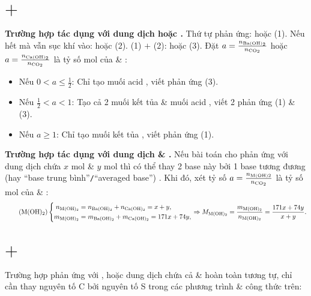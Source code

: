 \documentclass{article}
\begin{document}
\section{ $+$ }
\textbf{\textsf{Trường hợp  tác dụng với dung dịch  hoặc .}} Thứ tự phản ứng:  hoặc  (1). Nếu  hết mà vẫn sục khí  vào:  hoặc  (2). (1) $+$ (2):  hoặc  (3). Đặt $a = \frac{n_{\ce{Ba(OH)2}}}{n_{\ce{CO2}}}$ hoặc $a = \frac{n_{\ce{Ca(OH)2}}}{n_{\ce{CO2}}}$ là tỷ số mol của  \& :
\begin{itemize}
	\item Nếu $0 < a\le\frac{1}{2}$: Chỉ tạo muối acid , viết phản ứng (3).
	\item Nếu $\frac{1}{2} < a < 1$: Tạo cả 2 muối kết tủa  \& muối acid , viết 2 phản ứng (1) \& (3).
	\item Nếu $a\ge1$: Chỉ tạo muối kết tủa , viết phản ứng (1).
\end{itemize}
\textbf{\textsf{Trường hợp  tác dụng với dung dịch  \& .}} Nếu bài toán cho  phản ứng với dung dịch chứa $x$ mol  \& $y$ mol  thì có thể thay 2 base này bởi 1 base tương đương (hay ``base trung bình''{\tt/}``averaged base'') . Khi đó, xét tỷ số $a = \frac{n_{\rm M(OH)2}}{n_{\ce{CO2}}}$ là tỷ số mol của  \& :
\begin{equation}
	\label{M(OH)2}
	\tag{$\rm M(OH)_2$}
	\left\{\begin{split}
		n_{\ce{M(OH)2}} &= n_{\ce{Ba(OH)2}} + n_{\ce{Ca(OH)2}} = x + y,\\
		m_{\ce{M(OH)2}} &= m_{\ce{Ba(OH)2}} + m_{\ce{Ca(OH)2}} = 171x + 74y,
	\end{split}\right.\Rightarrow M_{\ce{M(OH)2}} = \frac{m_{\ce{M(OH)2}}}{n_{\ce{M(OH)2}}} = \frac{171x + 74y}{x + y}.
\end{equation}

\section{ $+$ }
Trường hợp  phản ứng với , hoặc dung dịch chứa cả  \&  hoàn toàn tương tự, chỉ cần thay nguyên tố C bởi nguyên tố S trong các phương trình \& công thức trên:
\vspace{2mm}
\end{document}
